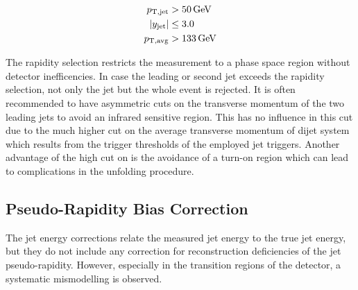 \begin{align*}
    \ptjet &> \SI{50}{\GeV}\\
    |y_\mathrm{jet}| &\leq 3.0\\
    \ptavg &> \SI{133}{\GeV}
\end{align*}

The rapidity selection restricts the measurement to a phase space region without
detector inefficencies. In case the leading or second jet exceeds the rapidity
selection, not only the jet but the whole event is rejected. It is often
recommended to have asymmetric cuts on the transverse momentum of the two
leading jets to avoid an infrared sensitive region. This has no influence in
this cut due to the much higher cut on the average transverse momentum of dijet
system which results from the trigger thresholds of the employed jet triggers.
Another advantage of the high cut on \ptavg is the avoidance of a turn-on region
which can lead to complications in the unfolding procedure.

\subsection{Pseudo-Rapidity Bias Correction}

The jet energy corrections relate the measured jet energy to the true jet
energy, but they do not include any correction for reconstruction deficiencies
of the jet pseudo-rapidity. However, especially in the transition regions of the
detector, a systematic mismodelling is observed. 

